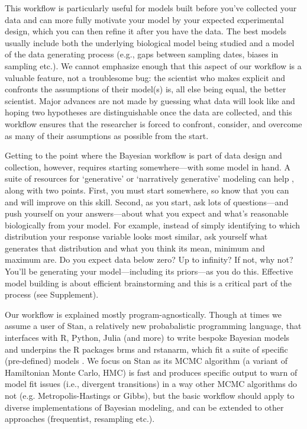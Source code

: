 \documentclass[11pt]{article}
\begin{document}
{This workflow is particularly useful for models built before you've collected your data and can more fully motivate your model by your expected experimental design, which you can then refine it after you have the data. The best models usually include both the underlying biological model being studied and a model of the data generating process (e.g., gaps between sampling dates, biases in sampling etc.). We cannot emphasize enough that this aspect of our workflow is a valuable feature, not a troublesome bug: the scientist who makes explicit and confronts the assumptions of their model(s) is, all else being equal, the better scientist. Major advances are not made by guessing what data will look like and hoping two hypotheses are distinguishable once the data are collected, and this workflow ensures that the researcher is forced to confront, consider, and overcome as many of their assumptions as possible from the start.

Getting to the point where the Bayesian workflow is part of data design and collection, however, requires starting somewhere---with some model in hand. A suite of resources for `generative' or `narratively generative' modeling can help \citep{statrethink,betangen}, along with two points. First, you must start somewhere, so know that you can and will improve on this skill. Second, as you start, ask lots of questions---and push yourself on your answers---about what you expect and what's reasonable biologically from your model. For example, instead of simply identifying to which distribution your response variable looks most similar, ask yourself what generates that distribution and what you think its mean, minimum and maximum are. Do you expect data below zero? Up to infinity? If not, why not? You'll be generating your model---including its priors---as you do this. Effective model building is about efficient brainstorming and this is a critical part of the process (see Supplement). 

Our workflow is explained mostly program-agnostically. Though at times we assume a user of \textsf{Stan}, a relatively new probabalistic programming language, that interfaces with \textsf{R, Python, Julia} (and more) to write bespoke Bayesian models and underpins the \textsf{R} packages \textsf{brms} and \textsf{rstanarm}, which fit a suite of specific (pre-defined) models \citep{Carpenter:2017stan}. We focus on \textsf{Stan} as its MCMC algorithm (a variant of Hamiltonian Monte Carlo, HMC) is fast and produces specific output to warn of model fit issues (i.e., divergent transitions) in a way other MCMC algorithms do not (e.g. Metropolis-Hastings or Gibbs), but the basic workflow should apply to diverse implementations of Bayesian modeling, and can be extended to other approaches (frequentist, resampling etc.). \\

}
\end{document}
